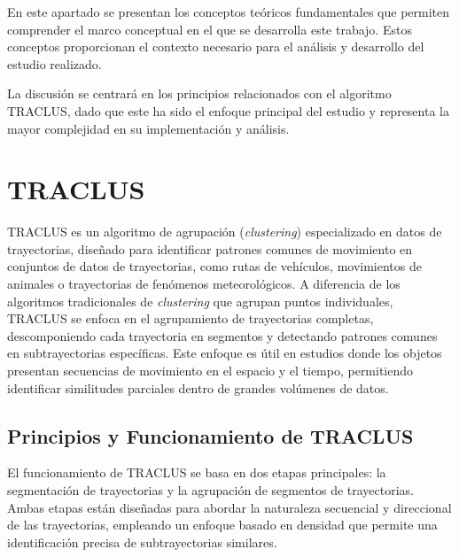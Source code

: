 
En este apartado se presentan los conceptos teóricos fundamentales que permiten comprender el marco conceptual en el que se desarrolla este trabajo. Estos conceptos proporcionan el contexto necesario para el análisis y desarrollo del estudio realizado.

La discusión se centrará en los principios relacionados con el algoritmo TRACLUS, dado que este ha sido el enfoque principal del estudio y representa la mayor complejidad en su implementación y análisis.

\section{TRACLUS}

TRACLUS es un algoritmo de agrupación (\textit{clustering}) especializado en datos de trayectorias, diseñado para identificar patrones comunes de movimiento en conjuntos de datos de trayectorias, como rutas de vehículos, movimientos de animales o trayectorias de fenómenos meteorológicos. A diferencia de los algoritmos tradicionales de \textit{clustering} que agrupan puntos individuales, TRACLUS se enfoca en el agrupamiento de trayectorias completas, descomponiendo cada trayectoria en segmentos y detectando patrones comunes en subtrayectorias específicas. Este enfoque es útil en estudios donde los objetos presentan secuencias de movimiento en el espacio y el tiempo, permitiendo identificar similitudes parciales dentro de grandes volúmenes de datos.

\subsection*{Principios y Funcionamiento de TRACLUS}

El funcionamiento de TRACLUS se basa en dos etapas principales: la segmentación de trayectorias y la agrupación de segmentos de trayectorias. Ambas etapas están diseñadas para abordar la naturaleza secuencial y direccional de las trayectorias, empleando un enfoque basado en densidad que permite una identificación precisa de subtrayectorias similares.

